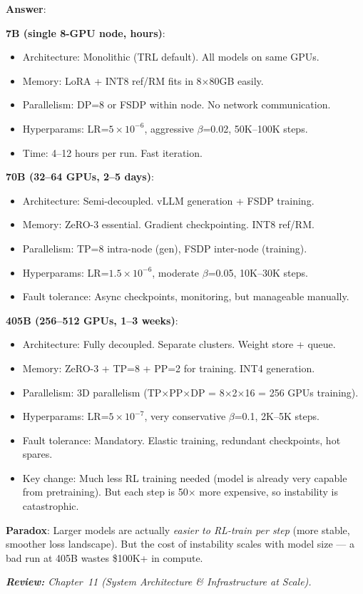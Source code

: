 \begin{questionbox}
\textbf{Answer}:

\textbf{7B (single 8-GPU node, hours)}:

\begin{itemize}
  \item Architecture: Monolithic (TRL default). All models on same GPUs.
  \item Memory: LoRA + INT8 ref/RM fits in 8$\times$80GB easily.
  \item Parallelism: DP=8 or FSDP within node. No network communication.
  \item Hyperparams: LR=$5\times10^{-6}$, aggressive $\beta$=0.02, 50K--100K steps.
  \item Time: 4--12 hours per run. Fast iteration.
\end{itemize}

\textbf{70B (32--64 GPUs, 2--5 days)}:

\begin{itemize}
  \item Architecture: Semi-decoupled. vLLM generation + FSDP training.
  \item Memory: ZeRO-3 essential. Gradient checkpointing. INT8 ref/RM.
  \item Parallelism: TP=8 intra-node (gen), FSDP inter-node (training).
  \item Hyperparams: LR=$1.5\times10^{-6}$, moderate $\beta$=0.05, 10K--30K steps.
  \item Fault tolerance: Async checkpoints, monitoring, but manageable manually.
\end{itemize}

\textbf{405B (256--512 GPUs, 1--3 weeks)}:

\begin{itemize}
  \item Architecture: Fully decoupled. Separate clusters. Weight store + queue.
  \item Memory: ZeRO-3 + TP=8 + PP=2 for training. INT4 generation.
  \item Parallelism: 3D parallelism (TP$\times$PP$\times$DP = 8$\times$2$\times$16 = 256 GPUs training).
  \item Hyperparams: LR=$5\times10^{-7}$, very conservative $\beta$=0.1, 2K--5K steps.
  \item Fault tolerance: Mandatory. Elastic training, redundant checkpoints, hot spares.
  \item Key change: Much less RL training needed (model is already very capable from pretraining). But each step is 50$\times$ more expensive, so instability is catastrophic.
\end{itemize}

\textbf{Paradox}: Larger models are actually \emph{easier to RL-train per step} (more stable, smoother loss landscape). But the cost of instability scales with model size --- a bad run at 405B wastes \$100K+ in compute.

\emph{\textbf{Review:} Chapter~11 (System Architecture \& Infrastructure at Scale).}
\end{questionbox}

